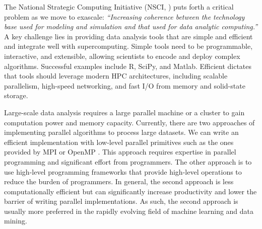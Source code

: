 
The National Strategic Computing Initiative (NSCI, \cite{NSCI}) puts forth a critical 
problem as we move to exascale: {\em ``Increasing coherence between the technology base used for 
modeling and simulation and that used for data analytic computing.''}  
A key challenge lies in providing data analysis tools that are simple and efficient
and integrate well with supercomputing.  Simple tools need to be programmable, 
interactive, and extensible, allowing scientists to encode and deploy complex algorithms. 
Successful examples include R, SciPy, and Matlab.  Efficient dictates that tools should 
leverage modern HPC architectures, including scalable parallelism, high-speed networking,
and fast I/O from memory and solid-state storage.




Large-scale data analysis requires a large parallel machine or a cluster to
gain computation power and memory capacity. Currently,
there are two approaches of implementing parallel algorithms to process large
datasets. We can write an efficient implementation with low-level parallel
primitives such as the ones provided by MPI \cite{mpi} or OpenMP \cite{openmp}.
This approach requires expertise in parallel programming and significant
effort from programmers. The other approach is to use high-level programming
frameworks that provide high-level operations to reduce the burden of
programmers. In general, the second approach is less computationally
efficient but can significantly increase productivity and lower the barrier
of writing parallel implementations. As such, the second approach is usually
more preferred in the rapidly evolving field of machine learning and data
mining.

